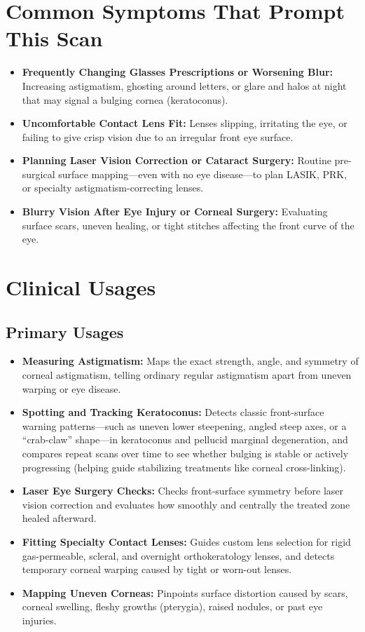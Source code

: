 \section{Common Symptoms That Prompt This Scan}
\begin{itemize}
    \item \textbf{Frequently Changing Glasses Prescriptions or Worsening Blur:} Increasing astigmatism, ghosting around letters, or glare and halos at night that may signal a bulging cornea (keratoconus).
    \item \textbf{Uncomfortable Contact Lens Fit:} Lenses slipping, irritating the eye, or failing to give crisp vision due to an irregular front eye surface.
    \item \textbf{Planning Laser Vision Correction or Cataract Surgery:} Routine pre-surgical surface mapping---even with no eye disease---to plan LASIK, PRK, or specialty astigmatism-correcting lenses.
    \item \textbf{Blurry Vision After Eye Injury or Corneal Surgery:} Evaluating surface scars, uneven healing, or tight stitches affecting the front curve of the eye.
\end{itemize}

\section{Clinical Usages}

\subsection{Primary Usages}
\begin{itemize}
    \item \textbf{Measuring Astigmatism:} Maps the exact strength, angle, and symmetry of corneal astigmatism, telling ordinary regular astigmatism apart from uneven warping or eye disease.
    \item \textbf{Spotting and Tracking Keratoconus:} Detects classic front-surface warning patterns---such as uneven lower steepening, angled steep axes, or a ``crab-claw'' shape---in keratoconus and pellucid marginal degeneration, and compares repeat scans over time to see whether bulging is stable or actively progressing (helping guide stabilizing treatments like corneal cross-linking).
    \item \textbf{Laser Eye Surgery Checks:} Checks front-surface symmetry before laser vision correction and evaluates how smoothly and centrally the treated zone healed afterward.
    \item \textbf{Fitting Specialty Contact Lenses:} Guides custom lens selection for rigid gas-permeable, scleral, and overnight orthokeratology lenses, and detects temporary corneal warping caused by tight or worn-out lenses.
    \item \textbf{Mapping Uneven Corneas:} Pinpoints surface distortion caused by scars, corneal swelling, fleshy growths (pterygia), raised nodules, or past eye injuries.
\end{itemize}

